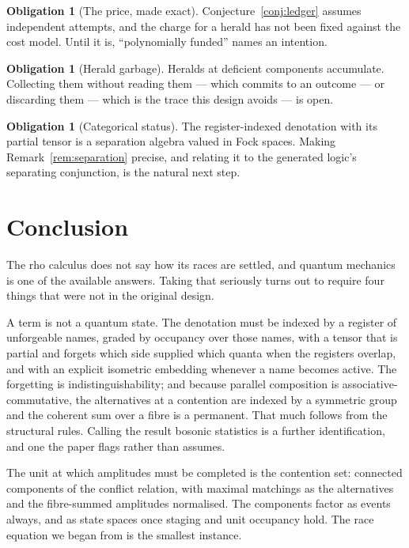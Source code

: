 \documentclass[11pt,a4paper]{article}
\theoremstyle{plain}
\theoremstyle{definition}
\newtheorem{obligation}[theorem]{Obligation}
\theoremstyle{remark}
\begin{document}
\begin{obligation}[The price, made exact]\label{ob:price}
Conjecture~\ref{conj:ledger} assumes independent attempts, and the charge for a
herald has not been fixed against the cost model. Until it is,
``polynomially funded'' names an intention.
\end{obligation}

\begin{obligation}[Herald garbage]\label{ob:garbage}
Heralds at deficient components accumulate. Collecting them without reading them
--- which commits to an outcome --- or discarding them --- which is the trace
this design avoids --- is open.
\end{obligation}

\begin{obligation}[Categorical status]\label{ob:cat}
The register-indexed denotation with its partial tensor is a separation algebra
valued in Fock spaces. Making Remark~\ref{rem:separation} precise, and relating
it to the generated logic's separating conjunction, is the natural next step.
\end{obligation}

\section{Conclusion}\label{sec:conc}

The rho calculus does not say how its races are settled, and quantum mechanics
is one of the available answers. Taking that seriously turns out to require four
things that were not in the original design.

A term is not a quantum state. The denotation must be indexed by a register of
unforgeable names, graded by occupancy over those names, with a tensor that is
partial and forgets which side supplied which quanta when the registers overlap,
and with an explicit isometric embedding whenever a name becomes active. The
forgetting is indistinguishability; and because parallel composition is
associative-commutative, the alternatives at a contention are indexed by a
symmetric group and the coherent sum over a fibre is a permanent. That much
follows from the structural rules. Calling the result bosonic statistics is a
further identification, and one the paper flags rather than assumes.

The unit at which amplitudes must be completed is the contention set: connected
components of the conflict relation, with maximal matchings as the alternatives
and the fibre-summed amplitudes normalised. The components factor as events
always, and as state spaces once staging and unit occupancy hold. The race
equation we began from is the smallest instance.
\end{document}
